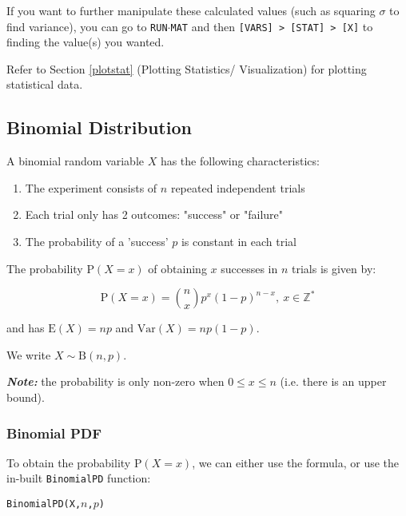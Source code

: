 \documentclass[a5paper,draft]{memoir}
\def\code#1{\texttt{#1}}
\def\note#1{\textbf{\textit{Note:}} #1}
\newcommand{\addtoindex}[1]{#1\index{#1}}
\begin{document}
If you want to further manipulate these calculated values (such as squaring $\sigma$ to find variance), you can go to \code{RUN$\cdot$MAT} and then \code{[VARS] > [STAT] > [X]} to finding the value(s) you wanted.

Refer to Section \ref{plotstat} (Plotting Statistics/ Visualization) for plotting statistical data.

\subsection{Binomial Distribution} \label{binom}
A binomial random variable $X$ has the following characteristics:
\begin{enumerate}
	\item The experiment consists of $n$ repeated independent trials
	\item Each trial only has 2 outcomes: "success" or "failure"
	\item The probability of a 'success' $p$ is constant in each trial
\end{enumerate}

The probability $\textrm{P}(X = x)$ of obtaining $x$ successes in $n$ trials is given by:

\begin{equation}
	\mathrm{P}(X=x) = {n \choose x} p^x(1-p)^{n-x},~x \in \mathbb{Z}^*
\end{equation}

and has $\mathrm{E}(X) = np$ and $\mathrm{Var}(X)=np(1-p)$.

We write $X \sim \mathrm{B}(n, p)$.

\note{the probability is only non-zero when $0 \leq x \leq n$ (i.e. there is an upper bound).}

\subsubsection{Binomial PDF}

To obtain the probability $\textrm{P}(X = x)$, we can either use the formula, or use the in-built \code{\addtoindex{BinomialPD}} function:
\begin{center}
	\code{BinomialPD(X,$n$,$p$)}
\end{center}
\end{document}
